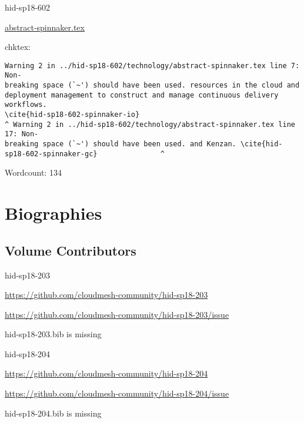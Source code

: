 

\begin{IU}

hid-sp18-602

\href{https://github.com/cloudmesh-community/hid-sp18-602/blob/master//technology/abstract-spinnaker.tex}{abstract-spinnaker.tex}

 
chktex:
\begin{tiny}
\begin{verbatim}
Warning 2 in ../hid-sp18-602/technology/abstract-spinnaker.tex line 7: Non-
breaking space (`~') should have been used. resources in the cloud and
deployment management to construct and manage continuous delivery workflows.
\cite{hid-sp18-602-spinnaker-io}
^ Warning 2 in ../hid-sp18-602/technology/abstract-spinnaker.tex line 17: Non-
breaking space (`~') should have been used. and Kenzan. \cite{hid-
sp18-602-spinnaker-gc}               ^
\end{verbatim}
\end{tiny}

Wordcount: 134

\end{IU}

\part{Biographies}
\chapter{Volume Contributors}


\begin{IU}

hid-sp18-203

\url{https://github.com/cloudmesh-community/hid-sp18-203}

\url{https://github.com/cloudmesh-community/hid-sp18-203/issue}

hid-sp18-203.bib is missing

\end{IU}


\begin{IU}

hid-sp18-204

\url{https://github.com/cloudmesh-community/hid-sp18-204}

\url{https://github.com/cloudmesh-community/hid-sp18-204/issue}

hid-sp18-204.bib is missing

\end{IU}


